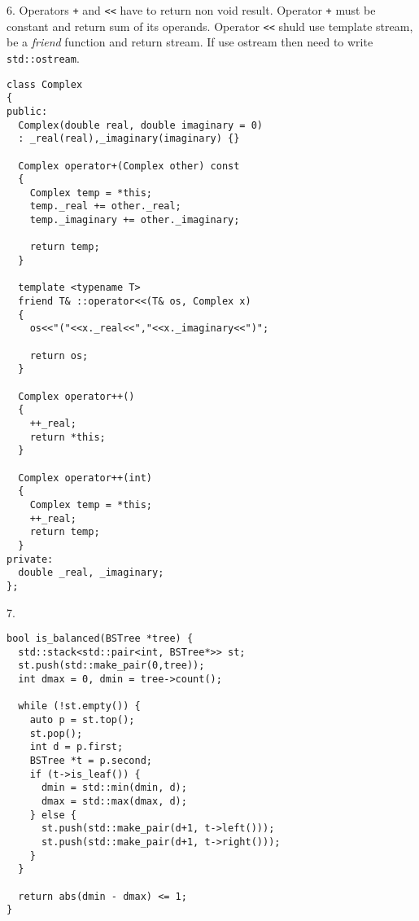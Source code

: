 \documentclass[a4paper, 14pt]{extarticle}
\begin{document}
6. Operators {\tt+} and {\tt<<} have to return non void result.
Operator {\tt+} must be constant and return sum of its operands.
Operator {\tt<<} shuld use template stream, be a \emph{friend}
function and return stream. If use ostream then need to write
{\tt std::ostream}.

\begin{lstlisting}
class Complex
{
public:
  Complex(double real, double imaginary = 0)
  : _real(real),_imaginary(imaginary) {}

  Complex operator+(Complex other) const
  {
    Complex temp = *this;
    temp._real += other._real;
    temp._imaginary += other._imaginary;

    return temp;
  }
  
  template <typename T>
  friend T& ::operator<<(T& os, Complex x)
  {
    os<<"("<<x._real<<","<<x._imaginary<<")";

    return os;
  }

  Complex operator++()
  {
    ++_real;
    return *this;
  }

  Complex operator++(int)
  {
    Complex temp = *this;
    ++_real;
    return temp;
  }
private:
  double _real, _imaginary;
};
\end{lstlisting}

7. 
\begin{lstlisting}
bool is_balanced(BSTree *tree) {
  std::stack<std::pair<int, BSTree*>> st;
  st.push(std::make_pair(0,tree));
  int dmax = 0, dmin = tree->count();

  while (!st.empty()) {
    auto p = st.top();
    st.pop();
    int d = p.first;
    BSTree *t = p.second;
    if (t->is_leaf()) {
      dmin = std::min(dmin, d);
      dmax = std::max(dmax, d);
    } else {
      st.push(std::make_pair(d+1, t->left()));
      st.push(std::make_pair(d+1, t->right()));
    }
  }

  return abs(dmin - dmax) <= 1;
}
\end{lstlisting}
\end{document}
